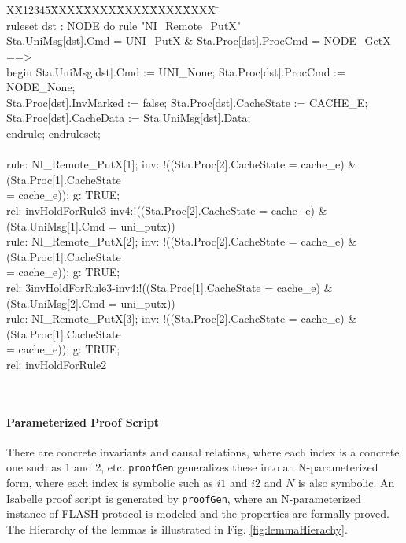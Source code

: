 \documentclass{llncs}
\newlength{\fminilength}
\newenvironment{fmini}[1][\linewidth]
  {\setlength{\fminilength}{#1\fboxsep-2\fboxrule}%
   \vspace{2ex}\noindent\begin{lrbox}{\fminibox}\begin{minipage}{\fminilength}%
   \mbox{ }\hfill\vspace{-2.5ex}}%
  {\end{minipage}\end{lrbox}\vspace{1ex}\hspace{0ex}%
   \framebox{\usebox{\fminibox}}}
\newenvironment{specification}
{\noindent\scriptsize
\tt\begin{fmini}\begin{tabbing}X\=X12345\=XXXX\=XXXX\=XXXX\=XXXX\=XXXX
\=\+\kill} {\end{tabbing}\normalfont\end{fmini}}
\begin{document}
\begin{specification}\\
ruleset dst : NODE do rule "NI\_Remote\_PutX"\\
  Sta.UniMsg[dst].Cmd = UNI\_PutX \&  Sta.Proc[dst].ProcCmd = NODE\_GetX\\
==>\\
begin   Sta.UniMsg[dst].Cmd := UNI\_None;  Sta.Proc[dst].ProcCmd := NODE\_None;\\
  Sta.Proc[dst].InvMarked := false;   Sta.Proc[dst].CacheState := CACHE\_E;\\
  Sta.Proc[dst].CacheData := Sta.UniMsg[dst].Data;\\
endrule; endruleset;\\\\
rule: NI\_Remote\_PutX[1]; inv: !((Sta.Proc[2].CacheState = cache\_e) \& (Sta.Proc[1].CacheState\\ = cache\_e)); g: TRUE; \\
rel: invHoldForRule3-inv4:!((Sta.Proc[2].CacheState = cache\_e) \& (Sta.UniMsg[1].Cmd = uni\_putx))\\
rule: NI\_Remote\_PutX[2]; inv: !((Sta.Proc[2].CacheState = cache\_e) \& (Sta.Proc[1].CacheState\\ = cache\_e)); g: TRUE; \\
rel: 3invHoldForRule3-inv4:!((Sta.Proc[1].CacheState = cache\_e) \& (Sta.UniMsg[2].Cmd = uni\_putx))\\
rule: NI\_Remote\_PutX[3]; inv: !((Sta.Proc[2].CacheState = cache\_e) \& (Sta.Proc[1].CacheState\\ = cache\_e)); g: TRUE;\\
 rel: invHoldForRule2\\
\end{specification}\\

\vspace{-10pt}
\paragraph{Parameterized Proof Script} There are concrete invariants and causal relations, where each  index is a concrete one such as 1 and 2, etc. {\tt proofGen} generalizes these into an N-parameterized form, where each index is symbolic such as $i1$ and $i2$ and $N$ is also symbolic. An Isabelle proof script is  generated by {\tt proofGen}, where an N-parameterized instance of FLASH protocol is modeled   and the properties are formally proved. The Hierarchy of the lemmas is illustrated in Fig. \ref{fig:lemmaHierachy}. %
\end{document}
